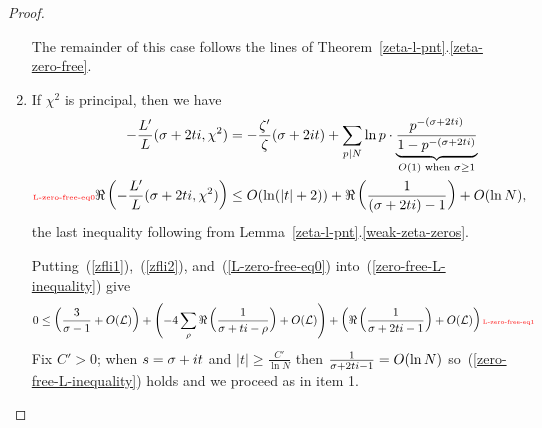 \begin{proof}
\begin{enumerate}
The remainder of this case follows the lines of Theorem~\ref{zeta-l-pnt}.\ref{zeta-zero-free}.
\item
If $\chi^2$ is principal, then we have
\begin{align}\nonumber
-\frac{L'}{L}(\si+2ti,\chi^2)&=-\frac{\ze'}{\ze}(\si+2it)+\sum_{p\mid N} 
\ln p\cdot \underbrace{\frac{p^{-(\si+2ti)}}{1-p^{-(\si+2ti)}}}_{O(1)\text{ when }\si\ge 1}\\
\llabel{L-zero-free-eq0}
\Re\pa{-\fc{L'}{L}(\si+2ti,\chi^2)}
&\le O(\ln (|t|+2))+\Re\prc{(\si+2ti)-1}+O(\ln N),
\end{align}
the last inequality following from Lemma~\ref{zeta-l-pnt}.\ref{weak-zeta-zeros}.

Putting~(\ref{zfli1}),~(\ref{zfli2}), and~(\ref{L-zero-free-eq0}) into~(\ref{zero-free-L-inequality}) give
\begin{equation}
0\le \pa{\fc{3}{\si-1} +O(\cal L)}+\pa{-4\sum_{\rh} \Re\prc{\si+ti-\rh}+O(\cal L)}+\pa{\Re\prc{\si+2ti-1}+O(\cal L)}\llabel{L-zero-free-eq1}
\end{equation}
Fix $C'>0$; when $s=\sigma+it$ and $|t|\ge \frac{C'}{\ln N}$ then $\frac{1}{\sigma+2ti-1}=O(\ln N)$ so~(\ref{zero-free-L-inequality}) holds and we proceed as in item 1.


\end{enumerate}
\end{proof}
